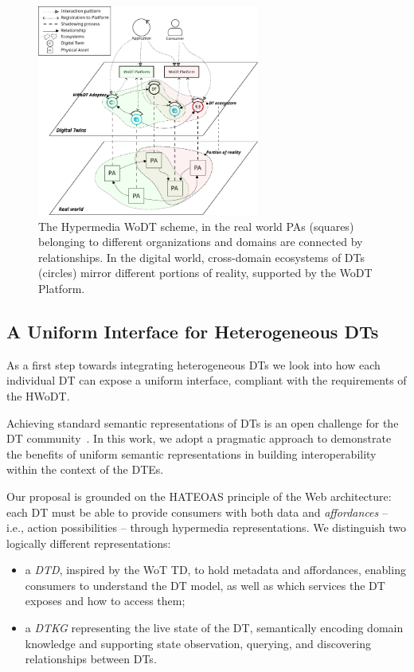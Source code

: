 \begin{figure}[t]
  \centering
  \includegraphics[width=0.65\textwidth]{figures/hwodt/hwodt.pdf}
  \caption{The Hypermedia WoDT scheme, in the real world PAs (squares) belonging to different organizations and domains are connected by relationships. In the digital world, cross-domain ecosystems of DTs (circles) mirror different portions of reality, supported by the WoDT Platform.}
  \label{fig:hwodt}
\end{figure}


\subsection{A Uniform Interface for Heterogeneous \aclp{DT}}\label{ssec:uniform-interface}

As a first step towards integrating heterogeneous \acp{DT} we look into how each individual \ac{DT} can expose a uniform interface, compliant with the requirements of the \ac{HWoDT}.

Achieving standard semantic representations of \acp{DT} is an open challenge for the \ac{DT} community~\cite{burattini2024models}.
In this work, we adopt a pragmatic approach to demonstrate the benefits of uniform semantic representations in building interoperability within the context of the \acp{DTE}.

Our proposal is grounded on the \ac{HATEOAS} principle of the Web architecture:
each \ac{DT} must be able to provide consumers with both data and \emph{affordances} -- i.e., action possibilities -- through hypermedia representations.
We distinguish two logically different representations:
\begin{itemize}
    \item a \emph{\acf{DTD}}, inspired by the \ac{WoT} \acl{TD}, to hold metadata and affordances, enabling consumers to understand the \ac{DT} model, as well as which services the \ac{DT} exposes and how to access them;
    \item a \emph{\acf{DTKG}} representing the live state of the \ac{DT}, semantically encoding domain knowledge and supporting state observation, querying, and discovering relationships between \acp{DT}.
\end{itemize}

